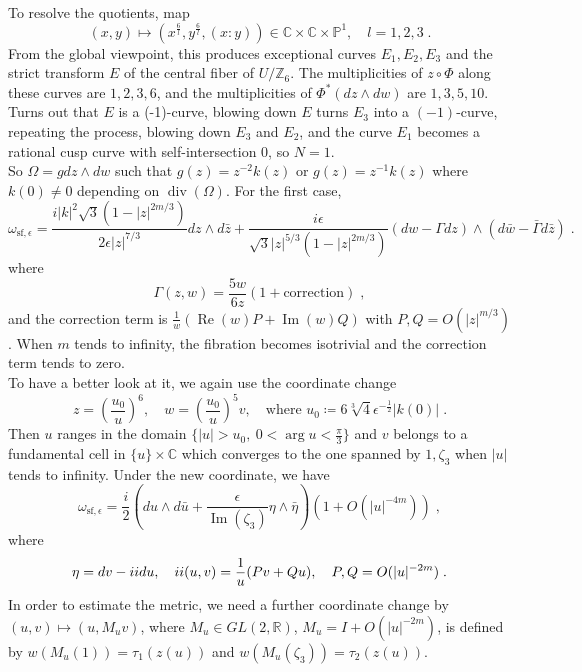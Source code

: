 To resolve the quotients, map
\[ (x,y)\mapsto (x^{\frac{6}{l}},y^{\frac{6}{l}},(x:y))\in \mathbb{C}\times\mathbb{C}\times\mathbb{P}^1,\quad l=1,2,3\; . \]
\indent From the global viewpoint, this produces exceptional curves $E_1,E_2,E_3$ and the strict transform $E$ of the central fiber of $U/\mathbb{Z}_6$. The multiplicities of $z\circ\Phi$ along these curves are $1,2,3,6$, and the multiplicities of $\Phi^*(dz\wedge dw)$ are $1,3,5,10$.\\ \indent
Turns out that $E$ is a (-1)-curve, blowing down $E$ turns $E_3$ into a $(-1)$-curve, repeating the process, blowing down $E_3$ and $E_2$, and the curve $E_1$ becomes a rational cusp curve with self-intersection 0, so $N=1$.\\ \indent
So $\Omega=gdz\wedge dw$ such that $g(z)=z^{-2}k(z)$ or $g(z)=z^{-1}k(z)$ where $k(0)\neq 0$ depending on $\operatorname{div}(\Omega)$. For the first case,
\[ \omega_{\mathrm{sf},\epsilon}=\frac{i|k|^2\sqrt{3}(1-|z|^{2m/3})}{2\epsilon|z|^{7/3}}dz\wedge d\bar{z}+\frac{i\epsilon}{\sqrt{3}|z|^{5/3}(1-|z|^{2m/3})}(dw-\Gamma dz)\wedge(d\bar{w}-\bar{\Gamma}d\bar{z})\; . \]
where
\[ \Gamma(z,w)=\frac{5w}{6z}(1+\textrm{correction})\; , \]
and the correction term is $\frac{1}{w}(\operatorname{Re}(w)P+\operatorname{Im}(w)Q)$ with $P,Q=O(|z|^{m/3})$. When $m$ tends to infinity, the fibration becomes isotrivial and the correction term tends to zero.\\ \indent
To have a better look at it, we again use the coordinate change
\[ z=\left(\frac{u_0}{u}\right)^6,\quad w=\left(\frac{u_0}{u}\right)^5v,\quad \textrm{where }u_0\coloneq 6\sqrt[3]{4}\epsilon^{-\frac{1}{2}}|k(0)|\; . \]
\indent Then $u$ ranges in the domain $\{|u|>u_0,~0<\arg u<\frac{\pi}{3}\}$ and $v$ belongs to a fundamental cell in $\{u\}\times\mathbb{C}$ which converges to the one spanned by $1,\zeta_3$ when $|u|$ tends to infinity. Under the new coordinate, we have
\[ \omega_{\mathrm{sf},\epsilon}=\frac{i}{2}\left(du\wedge d\bar{u}+\frac{\epsilon}{\operatorname{Im}(\zeta_3)}\eta\wedge\bar{\eta}\right)(1+O(|u|^{-4m}))\; , \]
where
\[ \eta=dv-\uppercase\expandafter{\romannumeral2}du,\quad \uppercase\expandafter{\romannumeral2}(u,v)=\frac{1}{u}(Pv+Qu),\quad P,Q=O(|u|^{-2m})\; . \]
\indent In order to estimate the metric, we need a further coordinate change by $(u,v)\mapsto(u,M_uv)$, where $M_u\in GL(2,\mathbb{R})$, $M_u=I+O(|u|^{-2m})$, is defined by $w(M_u(1))=\tau_1(z(u))$ and $w(M_u(\zeta_3))=\tau_2(z(u))$.\\ \indent
